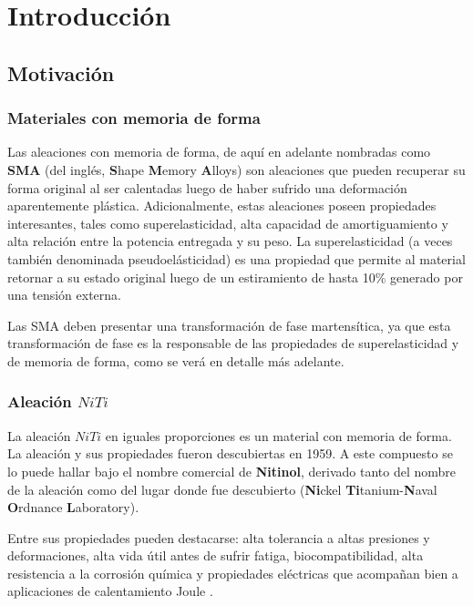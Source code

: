 \documentclass[12pt]{article}
\theoremstyle{definition}
\theoremstyle{remark}
\begin{document}
\newpage
\tableofcontents

\newpage
\section{Introducción}

\subsection{Motivación}

\subsubsection{Materiales con memoria de forma}

Las aleaciones con memoria de forma, de aquí en adelante nombradas como \textbf{SMA} (del inglés, \textbf{S}hape \textbf{M}emory \textbf{A}lloys) son aleaciones que pueden recuperar su forma original al ser calentadas luego de haber sufrido una deformación aparentemente plástica. Adicionalmente, estas aleaciones poseen propiedades interesantes, tales como superelasticidad, alta capacidad de amortiguamiento y alta relación entre la potencia entregada y su peso. La superelasticidad (a veces también denominada pseudoelásticidad) es una propiedad que permite al material retornar a su estado original luego de un estiramiento de hasta 10\% generado por una tensión externa\citep{Rubber}.

Las SMA deben presentar una transformación de fase martensítica, ya que esta transformación de fase es la responsable de las propiedades de superelasticidad y de memoria de forma, como se verá en detalle más adelante.

\subsubsection{Aleación $NiTi$}\label{aleation}
La aleación $NiTi$ en iguales proporciones es un material con memoria de forma. La aleación y sus propiedades fueron descubiertas en 1959. A este compuesto se lo puede hallar bajo el nombre comercial de \textbf{Nitinol}, derivado tanto del nombre de la aleación como del lugar donde fue descubierto (\textbf{Ni}ckel \textbf{Ti}tanium-\textbf{N}aval \textbf{O}rdnance \textbf{L}aboratory)\citep{Story}. 

Entre sus propiedades pueden destacarse: alta tolerancia a altas presiones y deformaciones, alta vida útil antes de sufrir fatiga, biocompatibilidad, alta resistencia a la corrosión química y propiedades eléctricas que acompañan bien a aplicaciones de calentamiento Joule \citep{ThinFilm}.
\end{document}
